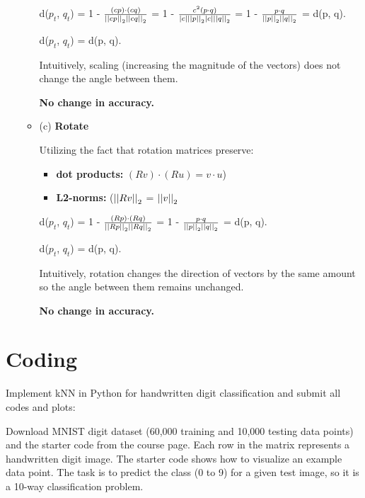 \documentclass[fleqn]{article}
\begin{document}
\begin{enumerate}
\begin{itemize}
		            d($p_t$, $q_t$) = 1 - $\frac{(c p) \cdot (c q)}{\left\vert\left\vert c p \right\vert\right\vert_2 \left\vert\left\vert c q \right\vert\right\vert_2}$ = 1 - $\frac{c^2 (p \cdot q)}{|c| \left\vert\left\vert p \right\vert\right\vert_2 |c| \left\vert\left\vert q \right\vert\right\vert_2}$ = 1 - $\frac{p \cdot q}{\left\vert\left\vert p \right\vert\right\vert_2 \left\vert\left\vert q \right\vert\right\vert_2}$ = d(p, q).

		            d($p_t$, $q_t$) = d(p, q).

		            Intuitively, scaling (increasing the magnitude of the vectors) does not change the angle between them.

		            \textbf{No change in accuracy.}

		      \item (c) \textbf{Rotate}

		            Utilizing the fact that rotation matrices preserve:
		            \begin{itemize}
			            \item \textbf{dot products:} $(Rv) \cdot (Ru) = v \cdot u$)
			            \item \textbf{L2-norms:} ($\left\vert\left\vert Rv \right\vert\right\vert_2$ = $\left\vert\left\vert v \right\vert\right\vert_2$
		            \end{itemize}

		            d($p_t$, $q_t$) = 1 - $\frac{(R p) \cdot (R q)}{\left\vert\left\vert R p \right\vert\right\vert_2 \left\vert\left\vert R q \right\vert\right\vert_2}$ = 1 - $\frac{p \cdot q}{\left\vert\left\vert p \right\vert\right\vert_2 \left\vert\left\vert q \right\vert\right\vert_2}$ = d(p, q).

		            d($p_t$, $q_t$) = d(p, q).

		            Intuitively, rotation changes the direction of vectors by the same amount so the angle between them remains unchanged.

		            \textbf{No change in accuracy.}
	      \end{itemize}
\end{enumerate}

\section{Coding}

Implement kNN in Python for handwritten digit classification and submit all codes and plots:

Download MNIST digit dataset (60,000 training and 10,000 testing data points) and the starter code from the course page. Each row in the matrix represents a handwritten digit image. The starter code shows how to visualize an example data point. The task is to predict the class (0 to 9) for a given test image, so it is a 10-way classification problem.
\end{document}
